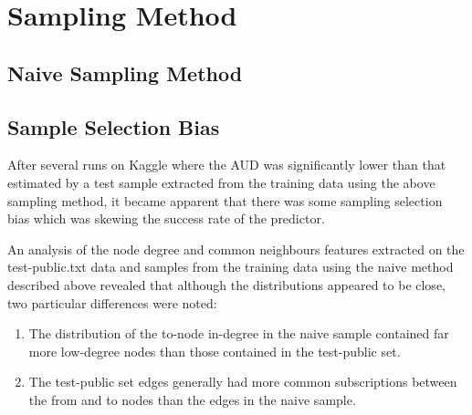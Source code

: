\section{Sampling Method}
\subsection{Naive Sampling Method}

\subsection{Sample Selection Bias}
After several runs on Kaggle where the AUD was significantly lower than that estimated by a test sample extracted from the training data using the above sampling method, it became apparent that there was some sampling selection bias which was skewing the success rate of the predictor.

An analysis of the node degree and common neighbours features extracted on the test-public.txt data and samples from the training data using the naive method described above revealed that although the distributions appeared to be close, two particular differences were noted: 

\begin{enumerate}
\item The distribution of the to-node in-degree in the naive sample contained far more low-degree nodes than those contained in the test-public set.
\item The test-public set edges generally had more common subscriptions between the from and to nodes than the edges in the naive sample.
\end{enumerate}

%

